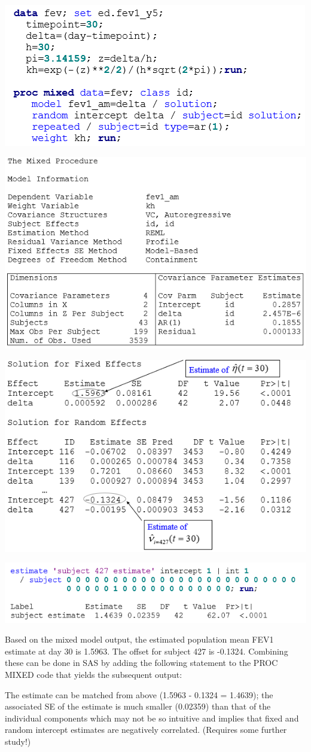 \documentclass[
  9pt,
  ignorenonframetext,
]{beamer}
\begin{document}
\begin{frame}{}
\protect\hypertarget{section-10}{}
\begin{center}\includegraphics[width=0.6\linewidth]{figs_L21/f3} \end{center}

\begin{center}\includegraphics[width=0.6\linewidth]{figs_L21/f4} \end{center}
\end{frame}

\begin{frame}{}
\protect\hypertarget{section-11}{}
\begin{center}\includegraphics[width=0.6\linewidth]{figs_L21/f5} \end{center}

\begin{center}\includegraphics[width=0.6\linewidth]{figs_L21/f6} \end{center}

Based on the mixed model output, the estimated population mean FEV1
estimate at day 30 is 1.5963. The offset for subject 427 is -0.1324.
Combining these can be done in SAS by adding the following statement to
the PROC MIXED code that yields the subsequent output:

The estimate can be matched from above (1.5963 - 0.1324 = 1.4639); the
associated SE of the estimate is much smaller (0.02359) than that of the
individual components which may not be so intuitive and implies that
fixed and random intercept estimates are negatively correlated.
(Requires some further study!)
\end{frame}
\end{document}
